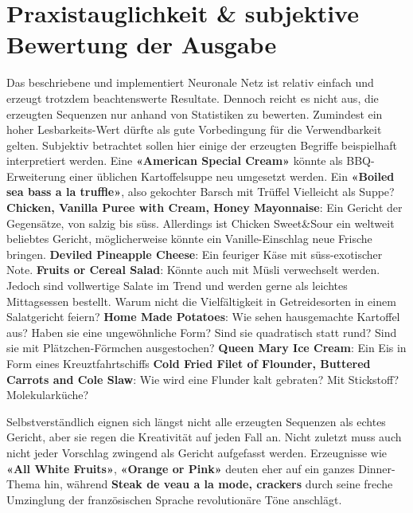 \section{Praxistauglichkeit \& subjektive Bewertung der Ausgabe}
\label{sub:in-practice}

Das beschriebene und implementiert Neuronale Netz ist relativ einfach und erzeugt trotzdem beachtenswerte Resultate.
Dennoch reicht es nicht aus, die erzeugten Sequenzen nur anhand von Statistiken zu bewerten.
Zumindest ein hoher Lesbarkeits-Wert dürfte als gute Vorbedingung für die Verwendbarkeit gelten.
Subjektiv betrachtet sollen hier einige der erzeugten Begriffe beispielhaft interpretiert werden.
Eine \textbf{«American Special Cream»} könnte als BBQ-Erweiterung einer üblichen Kartoffelsuppe neu umgesetzt werden.
Ein \textbf{«Boiled sea bass a la truffle»}, also gekochter Barsch mit Trüffel
Vielleicht als Suppe?
\textbf{Chicken, Vanilla Puree with Cream, Honey Mayonnaise}: Ein Gericht der Gegensätze, von salzig bis süss.
Allerdings ist Chicken Sweet\&Sour ein weltweit beliebtes Gericht, möglicherweise könnte ein Vanille-Einschlag neue Frische bringen.
\textbf{Deviled Pineapple Cheese}: Ein feuriger Käse mit süss-exotischer Note. \textbf{Fruits or Cereal Salad}: Könnte auch mit Müsli verwechselt werden.
Jedoch sind vollwertige Salate im Trend und werden gerne als leichtes Mittagsessen bestellt.
Warum nicht die Vielfältigkeit in Getreidesorten in einem Salatgericht feiern?
\textbf{Home Made Potatoes}: Wie sehen hausgemachte Kartoffel aus? Haben sie eine ungewöhnliche Form? Sind sie quadratisch statt rund? Sind sie mit Plätzchen-Förmchen ausgestochen? \textbf{Queen Mary Ice Cream}: Ein Eis in Form eines Kreuztfahrtschiffs
\textbf{Cold Fried Filet of Flounder, Buttered Carrots and Cole Slaw}: Wie wird eine Flunder kalt gebraten? Mit Stickstoff? Molekularküche?

Selbstverständlich eignen sich längst nicht alle erzeugten Sequenzen als echtes Gericht, aber sie regen die Kreativität auf jeden Fall an.
Nicht zuletzt muss auch nicht jeder Vorschlag zwingend als Gericht aufgefasst werden.
Erzeugnisse wie \textbf{«All White Fruits»}, \textbf{«Orange or Pink»} deuten eher auf ein ganzes Dinner-Thema hin, während \textbf{Steak de veau a la mode, crackers} durch seine freche Umzinglung der französischen Sprache revolutionäre Töne anschlägt.
